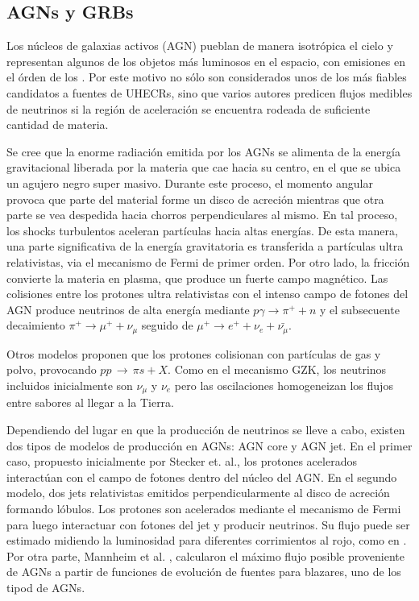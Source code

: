 	\subsection{AGNs y GRBs}
	Los n\'ucleos de galaxias activos (AGN) pueblan de manera isotr\'opica el cielo y representan algunos de los objetos m\'as luminosos en el espacio, con emisiones en el \'orden de los \cite{cite:GHZ}.
	Por este motivo no s\'olo son considerados unos de los m\'as fiables candidatos a fuentes de UHECRs, sino que varios autores predicen flujos medibles de neutrinos si la regi\'on de aceleraci\'on se encuentra rodeada de suficiente cantidad de materia.
	
	Se cree que la enorme radiaci\'on emitida por los AGNs se alimenta de la energ\'ia gravitacional liberada por la materia que cae hacia su centro, en el que se ubica un agujero negro super masivo.
	Durante este proceso, el momento angular provoca que parte del material forme un disco de acreci\'on mientras que otra parte se vea despedida hacia chorros perpendiculares al mismo.
	En tal proceso, los shocks turbulentos aceleran part\'iculas hacia altas energ\'ias.
	De esta manera, una parte significativa de la energ\'ia gravitatoria es transferida a part\'iculas ultra relativistas, via el mecanismo de Fermi de primer orden\cite{cite:Fermi1}.
	Por otro lado, la fricci\'on convierte la materia en plasma, que produce un fuerte campo magn\'etico.
	Las colisiones entre los protones ultra relativistas con el intenso campo de fotones del AGN produce neutrinos de alta energ\'ia mediante $p\gamma \rightarrow \pi^{+} + n$ y el subsecuente decaimiento $\pi^{+} \rightarrow \mu^{+} + \nu_{\mu}$ seguido de $\mu^{+} \rightarrow e^{+} + \nu_{e} + \bar{\nu_{\mu}}$.
	
	Otros modelos proponen que los protones colisionan con part\'iculas de gas y polvo, provocando $pp\,\rightarrow\,\pi s + X$.
	Como en el mecanismo GZK, los neutrinos incluidos inicialmente son $\nu_\mu$ y $\nu_e$ pero las oscilaciones homogeneizan los flujos entre sabores al llegar a la Tierra.
	
	Dependiendo del lugar en que la producci\'on de neutrinos se lleve a cabo, existen dos tipos de modelos de producci\'on en AGNs: AGN core y AGN jet.
	En el primer caso, propuesto inicialmente por Stecker et. al.\cite{cite:nuAGN}, los protones acelerados interact\'uan con el campo de fotones dentro del n\'ucleo del AGN. 
	En el segundo modelo, dos jets relativistas emitidos perpendicularmente al disco de acreci\'on formando l\'obulos. 
	Los protones son acelerados mediante el mecanismo de Fermi para luego interactuar con fotones del jet y producir neutrinos.
	Su flujo puede ser estimado midiendo la luminosidad para diferentes corrimientos al rojo, como en \cite{cite:Protheroe1}. Por otra parte, Mannheim et al. \cite{cite:Mannheim1}, calcularon el m\'aximo flujo posible proveniente de AGNs a partir de funciones de evoluci\'on de fuentes para blazares, uno de los tipod de AGNs.
	
